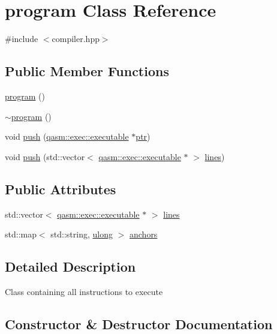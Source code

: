 \hypertarget{classprogram}{}\section{program Class Reference}
\label{classprogram}


{\ttfamily \#include $<$compiler.\+hpp$>$}

\subsection*{Public Member Functions}
\begin{DoxyCompactItemize}
\item 
\hyperlink{classprogram_a0772f916267bdb0eb4d803ea472e8e74}{program} ()
\item 
\hyperlink{classprogram_a31e130840978c25ba94a6ff2b192011c}{$\sim$program} ()
\item 
void \hyperlink{classprogram_ada37ef3924e109909695ef9bd55f54b3}{push} (\hyperlink{classqasm_1_1exec_1_1executable}{qasm\+::exec\+::executable} $\ast$\hyperlink{classptr}{ptr})
\item 
void \hyperlink{classprogram_a40b1420af44c92684d8ecc035f8d004c}{push} (std\+::vector$<$ \hyperlink{classqasm_1_1exec_1_1executable}{qasm\+::exec\+::executable} $\ast$ $>$ \hyperlink{classprogram_a827f0b22e21be3ce1e0e568a147488b9}{lines})
\end{DoxyCompactItemize}
\subsection*{Public Attributes}
\begin{DoxyCompactItemize}
\item 
std\+::vector$<$ \hyperlink{classqasm_1_1exec_1_1executable}{qasm\+::exec\+::executable} $\ast$ $>$ \hyperlink{classprogram_a827f0b22e21be3ce1e0e568a147488b9}{lines}
\item 
std\+::map$<$ std\+::string, \hyperlink{types_8h_ab2bb0e5480d1d957383df6b350794313}{ulong} $>$ \hyperlink{classprogram_ae17b7e99958aa0770b1cc4a8c20acbfe}{anchors}
\end{DoxyCompactItemize}


\subsection{Detailed Description}
Class containing all instructions to execute 

\subsection{Constructor \& Destructor Documentation}
